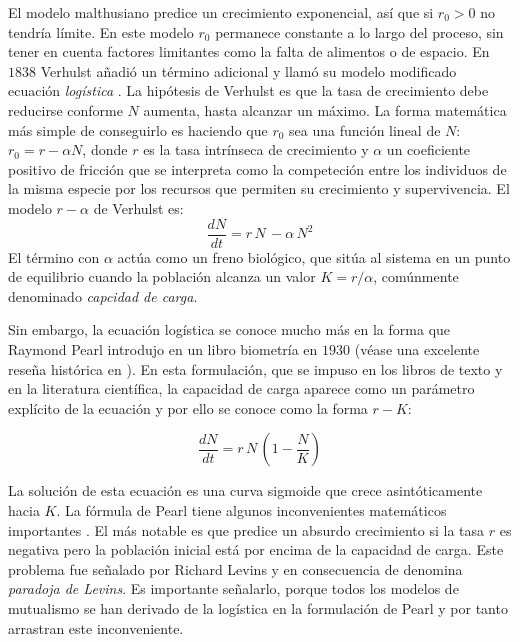 El modelo malthusiano predice un crecimiento exponencial, así que si $r_0 > 0$ no tendría límite. En este modelo $r_0$ permanece constante a lo largo del proceso, sin tener en cuenta factores limitantes como la falta de alimentos o de espacio. En $1838$ Verhulst añadió un término adicional y llamó su modelo modificado ecuación \emph{logística} \cite{verhulst1845}. La hipótesis de Verhulst es que la tasa de crecimiento debe reducirse conforme $N$ aumenta, hasta alcanzar un máximo. La forma matemática más simple de conseguirlo es haciendo que $r_0$ sea una función lineal de $N$: $ r_0 = r - \alpha N$, donde $r$ es la tasa intrínseca de crecimiento y $\alpha$ un coeficiente positivo de fricción que se interpreta como la competeción entre los individuos de la misma especie por los recursos que permiten su crecimiento y supervivencia. El modelo $r-\alpha$ de Verhulst es:
\begin{equation}
\frac{dN}{dt}=r \, N \,  - \alpha  \, N^2 
\label{eq:primitiveverhulst}
\end{equation}
El término con $\alpha$ actúa como un freno biológico, que sitúa al sistema en un punto de equilibrio cuando la población alcanza un valor $ K = r / \alpha$, comúnmente denominado \emph{capcidad de carga}.

Sin embargo, la ecuación logística se conoce mucho más en la forma que Raymond Pearl introdujo en un libro biometría en $1930$ (véase una excelente reseña histórica en \cite{mallet2012struggle}). En esta formulación, que se impuso en los libros de texto y en la literatura científica, la capacidad de carga aparece como un parámetro explícito de la ecuación y por ello se conoce como la forma $r-K$:

\begin{equation}
\frac{dN}{dt}=r \, N \, \left(1-\frac{N}{K}\right)
\label{pearl}
\end{equation}

La solución de esta ecuación es una curva sigmoide que crece asintóticamente hacia $K$. La fórmula de Pearl tiene algunos inconvenientes matemáticos importantes \citep{kuno1991some,gabriel2005paradoxes}. El más notable es que predice un absurdo crecimiento si la tasa $r$ es negativa pero la población inicial está por encima de la capacidad de carga. Este problema fue señalado por Richard Levins y en consecuencia de denomina \textit{paradoja de Levins}. Es importante señalarlo, porque todos los modelos de mutualismo se han derivado de la logística en la formulación de Pearl y por tanto arrastran este inconveniente.


